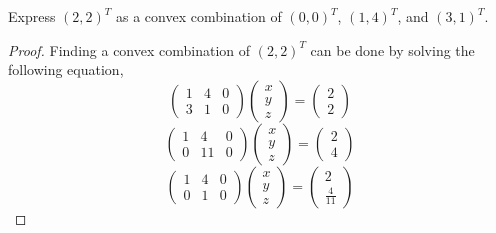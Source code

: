 \documentclass[12pt]{article}
\makeatletter
\theoremstyle{homework}
\newenvironment{exercise}[1]
{\def\@currentlabel{#1}\exercisecore}
{\endexercisecore}
\makeatother
\begin{document}
\begin{exercise}{3.18} Express $(2,2)^T$ as a convex combination of $(0, 0)^T$, $(1, 4)^T$, and $(3, 1)^T$.
  \begin{proof} Finding a convex combination of $(2, 2)^T$ can be done by solving the following equation, 
    \begin{equation*}
      \begin{pmatrix}
        1&4 &0 \\
        3&1 &0  
      \end{pmatrix}
      \begin{pmatrix}
        x\\
        y\\
        z
      \end{pmatrix}
       = 
       \begin{pmatrix}
        2\\
        2
       \end{pmatrix}
    \end{equation*}
    \begin{equation*}
      \begin{pmatrix}
        1&4 &0 \\
        0&11 &0  
      \end{pmatrix}
      \begin{pmatrix}
        x\\
        y\\
        z
      \end{pmatrix}
       = 
       \begin{pmatrix}
        2\\
        4
       \end{pmatrix}
    \end{equation*}
    \begin{equation*}
      \begin{pmatrix}
        1&4 &0 \\
        0&1 &0  
      \end{pmatrix}
      \begin{pmatrix}
        x\\
        y\\
        z
      \end{pmatrix}
       = 
       \begin{pmatrix}
        2\\
        \frac{4}{11}
       \end{pmatrix}
    \end{equation*}
    \begin{equation*}

\end{equation*}
\end{proof}
\end{exercise}
\end{document}
